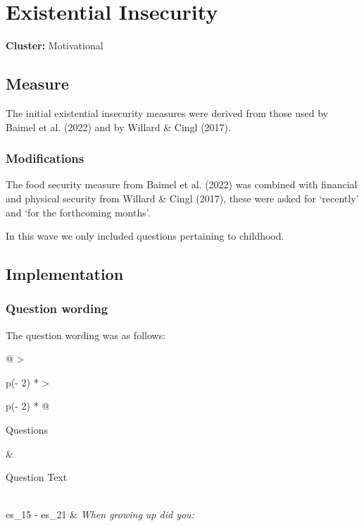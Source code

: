 \documentclass[
  letterpaper,
]{scrbook}
\begin{document}
\chapter{Existential Insecurity}\label{existential-insecurity-1}

\textbf{Cluster:} Motivational

\section{Measure}\label{measure-15}

The initial existential insecurity measures were derived from those used
by Baimel et al. (2022) and by Willard \& Cingl (2017).

\subsection*{Modifications}\label{modifications-13}

The food security measure from Baimel et al. (2022) was combined with
financial and physical security from Willard \& Cingl (2017), these were
asked for `recently' and `for the forthcoming months'.

In this wave we only included questions pertaining to childhood.

\section{Implementation}\label{implementation-15}

\subsection*{Question wording}\label{question-wording-15}

The question wording was as follows:

\begin{longtable}[]{@{}
  >{\raggedright\arraybackslash}p{(\columnwidth - 2\tabcolsep) * }
  >{\raggedright\arraybackslash}p{(\columnwidth - 2\tabcolsep) * }@{}}
\toprule\noalign{}
\begin{minipage}[b]{\linewidth}\raggedright
Questions
\end{minipage} & \begin{minipage}[b]{\linewidth}\raggedright
Question Text
\end{minipage} \\
\midrule\noalign{}
\endhead
\bottomrule\noalign{}
\endlastfoot
es\_15 - es\_21 & \emph{When growing up did you:} \\
\end{longtable}
\end{document}
